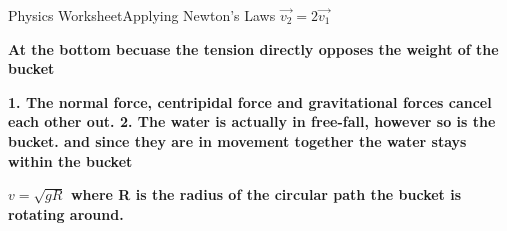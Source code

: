 \documentclass[12pt]{article}
\begin{document}
\begin{worksheet}{Physics Worksheet}{Applying Newton's Laws}
\textbf{$\vec{v_2} = 2\vec{v_1}$}


\vspace{5cm}






\textbf{At the bottom becuase the tension directly opposes the weight of the bucket}
\vspace{4cm}


\textbf{1. The normal force, centripidal force and gravitational forces cancel each other out. 2. The water is actually in free-fall, however so is the bucket. and since they are in movement together the water stays within the bucket}
\vspace{2cm}



\textbf{$v=\sqrt{gR}$ where R is the radius of the circular path the bucket is rotating around.}




\end{worksheet}
\end{document}
